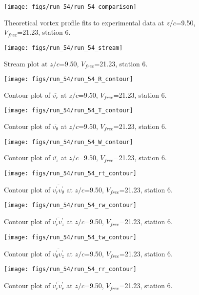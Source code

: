 \begin{figure}[H]
\centering
\texttt{[image: figs/run\_54/run\_54\_comparison]}
\caption{Theoretical vortex profile fits to experimental data at $z/c$=9.50, $V_{free}$=21.23, station 6.}
\end{figure}


\begin{figure}[H]
\centering
\texttt{[image: figs/run\_54/run\_54\_stream]}
\caption{Stream plot at $z/c$=9.50, $V_{free}$=21.23, station 6.}
\end{figure}


\begin{figure}[H]
\centering
\texttt{[image: figs/run\_54/run\_54\_R\_contour]}
\caption{Contour plot of $\overline{v_{r}}$ at $z/c$=9.50, $V_{free}$=21.23, station 6.}
\end{figure}


\begin{figure}[H]
\centering
\texttt{[image: figs/run\_54/run\_54\_T\_contour]}
\caption{Contour plot of $\overline{v_{\theta}}$ at $z/c$=9.50, $V_{free}$=21.23, station 6.}
\end{figure}


\begin{figure}[H]
\centering
\texttt{[image: figs/run\_54/run\_54\_W\_contour]}
\caption{Contour plot of $\overline{v_{z}}$ at $z/c$=9.50, $V_{free}$=21.23, station 6.}
\end{figure}


\begin{figure}[H]
\centering
\texttt{[image: figs/run\_54/run\_54\_rt\_contour]}
\caption{Contour plot of $\overline{v_{r}^{\prime} v_{\theta}^{\prime}}$ at $z/c$=9.50, $V_{free}$=21.23, station 6.}
\end{figure}


\begin{figure}[H]
\centering
\texttt{[image: figs/run\_54/run\_54\_rw\_contour]}
\caption{Contour plot of $\overline{v_{r}^{\prime} v_{z}^{\prime}}$ at $z/c$=9.50, $V_{free}$=21.23, station 6.}
\end{figure}


\begin{figure}[H]
\centering
\texttt{[image: figs/run\_54/run\_54\_tw\_contour]}
\caption{Contour plot of $\overline{v_{\theta}^{\prime} v_{z}^{\prime}}$ at $z/c$=9.50, $V_{free}$=21.23, station 6.}
\end{figure}


\begin{figure}[H]
\centering
\texttt{[image: figs/run\_54/run\_54\_rr\_contour]}
\caption{Contour plot of $\overline{v_{r}^{\prime} v_{r}^{\prime}}$ at $z/c$=9.50, $V_{free}$=21.23, station 6.}
\end{figure}


